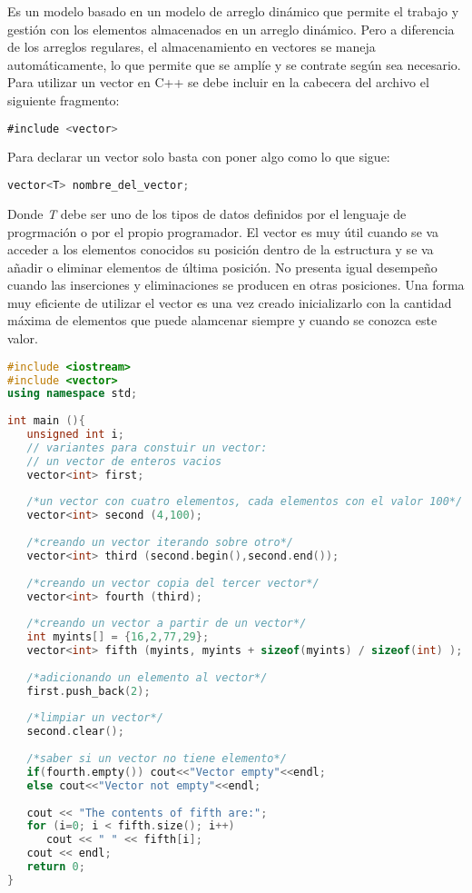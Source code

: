 Es un modelo basado en un modelo de arreglo dinámico que permite el trabajo y gestión con los elementos almacenados en un arreglo dinámico. Pero a diferencia de los arreglos regulares, el almacenamiento en vectores se maneja automáticamente, lo que permite que se amplíe y se contrate según sea necesario. Para utilizar un vector en C++ se debe incluir en la cabecera del archivo el siguiente fragmento:

\begin{lstlisting}[language=Java]
#include <vector>
\end{lstlisting} 

Para declarar un vector solo basta con poner algo como lo que sigue:

\begin{lstlisting}[language=Java]
vector<T> nombre_del_vector;
\end{lstlisting}

Donde {\em T} debe ser uno de los tipos de datos definidos por el lenguaje de progrmación o por el propio programador. El vector es muy útil cuando se va acceder a los elementos conocidos su posición dentro de la estructura y se va añadir o eliminar elementos de última posición. No presenta igual desempeño cuando las inserciones y eliminaciones se producen en otras posiciones. Una forma muy eficiente de utilizar el vector es una vez creado inicializarlo con la cantidad máxima de elementos que puede alamcenar siempre y cuando se conozca este valor.

\begin{lstlisting}[language=C++]
#include <iostream>
#include <vector>
using namespace std;
	
int main (){
   unsigned int i;
   // variantes para constuir un vector:
   // un vector de enteros vacios
   vector<int> first;
		
   /*un vector con cuatro elementos, cada elementos con el valor 100*/
   vector<int> second (4,100);
		
   /*creando un vector iterando sobre otro*/                                           
   vector<int> third (second.begin(),second.end()); 
		
   /*creando un vector copia del tercer vector*/
   vector<int> fourth (third);
		
   /*creando un vector a partir de un vector*/
   int myints[] = {16,2,77,29};
   vector<int> fifth (myints, myints + sizeof(myints) / sizeof(int) );
		
   /*adicionando un elemento al vector*/
   first.push_back(2);
		
   /*limpiar un vector*/
   second.clear();
		
   /*saber si un vector no tiene elemento*/
   if(fourth.empty()) cout<<"Vector empty"<<endl;
   else cout<<"Vector not empty"<<endl;
   
   cout << "The contents of fifth are:";
   for (i=0; i < fifth.size(); i++)
      cout << " " << fifth[i];
   cout << endl;
   return 0;
}
\end{lstlisting}